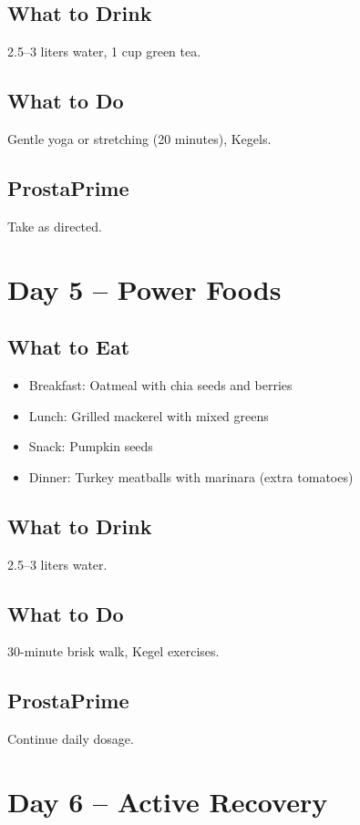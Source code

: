 \documentclass[11pt,oneside]{book}
\begin{document}
\section*{What to Drink}
2.5--3 liters water, 1 cup green tea.

\section*{What to Do}
Gentle yoga or stretching (20 minutes), Kegels.

\section*{ProstaPrime}
Take as directed.

\clearpage
\chapter*{Day 5 – Power Foods}

\section*{What to Eat}
\begin{itemize}[leftmargin=*]
\item Breakfast: Oatmeal with chia seeds and berries
\item Lunch: Grilled mackerel with mixed greens
\item Snack: Pumpkin seeds
\item Dinner: Turkey meatballs with marinara (extra tomatoes)
\end{itemize}

\section*{What to Drink}
2.5--3 liters water.

\section*{What to Do}
30-minute brisk walk, Kegel exercises.

\section*{ProstaPrime}
Continue daily dosage.

\clearpage
\chapter*{Day 6 – Active Recovery}
\end{document}
